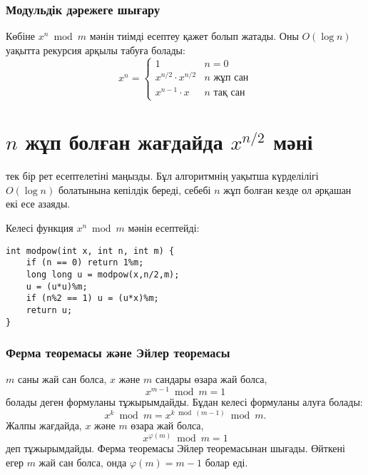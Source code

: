\subsubsection{Модульдік дәрежеге шығару}

Көбіне $x^n \bmod m$ мәнін тиімді есептеу қажет болып жатады.
Оны $O(\log n)$ уақытта рекурсия арқылы табуға болады:
\begin{equation*}
    x^n = \begin{cases}
               1        & n = 0\\
               x^{n/2} \cdot x^{n/2} & \text{$n$ жұп сан}\\
               x^{n-1} \cdot x & \text{$n$ тақ сан}
           \end{cases}
\end{equation*}

\section{$n$ жұп болған жағдайда $x^{n/2}$ мәні }
тек бір рет есептелетіні маңызды.
Бұл алгоритмнің уақытша күрделілігі $O(\log n)$ 
болатынына кепілдік береді, себебі $n$ жұп болған 
кезде ол әрқашан екі есе азаяды.

Келесі функция $x^n \bmod m$ мәнін есептейді:

\begin{lstlisting}
int modpow(int x, int n, int m) {
    if (n == 0) return 1%m;
    long long u = modpow(x,n/2,m);
    u = (u*u)%m;
    if (n%2 == 1) u = (u*x)%m;
    return u;
}
\end{lstlisting}

\subsubsection{Ферма теоремасы және Эйлер теоремасы}


$m$ саны жай сан болса, $x$ және $m$ сандары өзара жай болса,
\[x^{m-1} \bmod m = 1\]
болады деген формуланы тұжырымдайды.
Бұдан келесі формуланы алуға болады:
\[x^k \bmod m = x^{k \bmod (m-1)} \bmod m.\]
Жалпы жағдайда, 
$x$ және $m$ өзара жай болса,
\[x^{\varphi(m)} \bmod m = 1\]
деп тұжырымдайды.
Ферма теоремасы Эйлер теоремасынан шығады. Өйткені егер
$m$ жай сан болса, онда $\varphi(m)=m-1$ болар еді.

